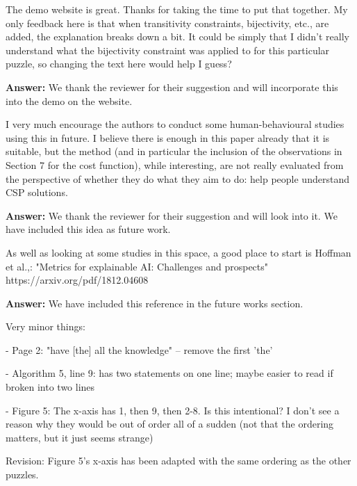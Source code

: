 \documentclass{article}
\newcommand\comment[1]{\marginpar{\tiny #1}}
\renewcommand\comment[1]{#1}
\newcommand{\tias}[1]{{\comment{\color{blue}\textsc{TG:}#1}}}
\newcommand{\emilio}[1]{{\comment{\color{red} \textsc{EG:}#1}}}
\newcommand{\Revision}[1]{{\comment{Revision: #1}}}
\newcommand{\answer}[1]{{\comment{\textbf{Answer:} #1}}}
\newcommand{\bart}[1]{{\comment{\color{green} \textsc{BB:}#1}}}
\begin{document}
\begin{quoteit}
The demo website is great. Thanks for taking the time to put that together. My only feedback here is that when transitivity constraints, bijectivity, etc., are added, the explanation breaks down a bit. It could be simply that I didn't really  understand what the bijectivity constraint was applied to for this particular puzzle, so changing the text here would help I guess?
\end{quoteit}

\answer{We thank the reviewer for their suggestion and will incorporate this into the demo on the website.} 

\begin{quoteit}
I very much encourage the authors to conduct some human-behavioural studies using this in future. I believe there is enough in this paper already that it is suitable, but the method (and in particular the inclusion of the observations in Section 7 for the cost function), while interesting, are not really evaluated from the perspective of whether they do what they aim to do: help people understand CSP solutions. 
\end{quoteit}

\answer{We thank the reviewer for their suggestion and will look into it. We have included this idea as future work.} 


\begin{quoteit}
As well as looking at some studies in this space, a good place to start is Hoffman et al.,: "Metrics for explainable AI: Challenges and prospects" https://arxiv.org/pdf/1812.04608 
\end{quoteit}

\answer{We have included this reference in the future works section.}
\begin{quoteit}
Very minor things:

- Page 2: "have [the] all the knowledge" -- remove the first 'the'

- Algorithm 5, line 9: has two statements on one line; maybe easier to
read if broken into two lines

- Figure 5: The x-axis has 1, then 9, then 2-8. Is this intentional? I
don't see a reason why they would be out of order all of a sudden (not
that the ordering matters, but it just seems strange)
\end{quoteit}

\Revision{Figure 5's x-axis has been adapted with the same ordering as the other puzzles.}




\end{document}

